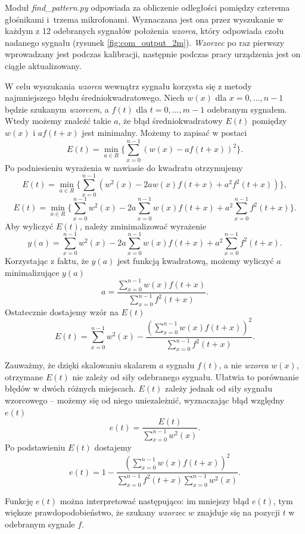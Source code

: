 Moduł \textit{find\_pattern.py} odpowiada za obliczenie odległości pomiędzy czterema głośnikami i~trzema mikrofonami.
Wyznaczana jest ona przez wyszukanie w każdym z 12 odebranych sygnałów  położenia \textit{wzorca}, który 
odpowiada czołu nadanego sygnału (rysunek \ref{fig:com_output_2m}).
\textit{Wzorzec} po raz pierwszy wprowadzany jest podczas kalibracji, następnie 
podczas pracy urządzenia jest on ciągle aktualizowany.

W celu wyszukania \textit{wzorca} wewnątrz sygnału korzysta się z  metody najmniejszego błędu średniokwadratowego.
Niech $w(x)$  dla $x = 0, ..., n-1$ będzie szukanym \textit{wzorcem}, a $f(t)$ dla $t = 0, ..., m-1$ odebranym sygnałem.
Wtedy możemy znaleźć takie $a$, że błąd średniokwadratowy $E(t)$ pomiędzy $w(x)$ i $a f(t+x)$ jest minimalny.
Możemy to zapisać w postaci
\[
  E(t) = \min_{a \in R} \{ \sum_{x=0}^{n-1}  \left( w(x) - a f(t+x) \right) ^2 \}.
\]
Po podniesieniu wyrażenia w nawiasie do kwadratu otrzymujemy
\[
  E(t) = \min_{a \in R} \{ \sum_{x=0}^{n-1}  \left( w^2(x) -2a w(x) f(t+x) + a^2 f^2(t+x) \right) \},
\]
\[
  E(t) = \min_{a \in R} \{ \sum_{x=0}^{n-1}  w^2(x) -2a \sum_{x=0}^{n-1}  w(x) f(t+x) + a^2 \sum_{x=0}^{n-1} f^2(t+x) \}.
\]
Aby wyliczyć $E(t)$, należy zminimalizować wyrażenie
\[
  y(a) = \sum_{x=0}^{n-1}  w^2(x) -2a \sum_{x=0}^{n-1}  w(x) f(t+x) + a^2 \sum_{x=0}^{n-1} f^2(t+x).
\]
Korzystając z faktu, że $y(a)$ jest funkcją kwadratową, możemy wyliczyć $a$ minimalizujące $y(a)$
\[
  a = \frac{ \sum\limits_{x=0}^{n-1}  w(x) f(t+x) }{ \sum\limits_{x=0}^{n-1} f^2(t+x) }.
\]
Ostatecznie dostajemy wzór na $E(t)$
\[
  E(t) = \sum_{x=0}^{n-1}  w^2(x)  - \frac {\left(\sum\limits_{x=0}^{n-1}  w(x) f(t+x) \right)^2 } { \sum\limits_{x=0}^{n-1} f^2(t+x)}.
\]

Zauważmy, że dzięki skalowaniu skalarem $a$  sygnału $f(t)$, a nie \textit{wzorca} $w(x)$,
otrzymane $E(t)$ nie zależy od siły odebranego sygnału. Ułatwia to porównanie błędów w dwóch różnych miejscach.
$E(t)$ zależy jednak od siły sygnału wzorcowego -- możemy się od niego  uniezależnić, wyznaczając
błąd względny $e(t)$
\[
  e(t) = \frac{E(t)}{\sum\limits_{x=0}^{n-1}  w^2(x)}.
\]
Po podstawieniu $E(t)$ dostajemy
\[
  e(t) = 1 - \frac {\left(\sum\limits_{x=0}^{n-1}  w(x) f(t+x) \right)^2 } { \sum\limits_{x=0}^{n-1} f^2(t+x) \sum\limits_{x=0}^{n-1}  w^2(x)}.
\]
 
 Funkcję $e(t)$  można interpretować następująco:
 im mniejszy błąd $e(t)$, tym większe prawdopodobieństwo, że szukany \textit{wzorzec} $w$ znajduje się na pozycji $t$ w 
 odebranym sygnale $f$. 


